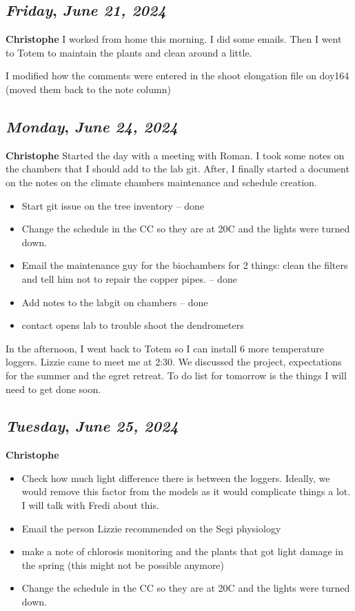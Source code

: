 \begin {itemize}
\def\day{\textit{June 21, 2024}}
\def\weekday{\textit{Friday}}
\subsection*{\weekday, \day}
\textbf {Christophe}
I worked from home this morning. I did some emails. Then I went to Totem to maintain the plants and clean around a little.
\par I modified how the comments were entered in the shoot elongation file on doy164 (moved them back to the note column)

\def\day{\textit{June 24, 2024}}
\def\weekday{\textit{Monday}}
\subsection*{\weekday, \day}
\textbf {Christophe}
Started the day with a meeting with Roman. I took some notes on the chambers that I should add to the lab git. After, I finally started a document on the notes on the climate chambers maintenance and schedule creation.
\begin {itemize}
	\item Start git issue on the tree inventory -- done
	\item Change the schedule in the CC so they are at 20C and the lights were turned down. 
	\item Email the maintenance guy for the biochambers for 2 things: clean the filters and tell him not to repair the copper pipes.  -- done
	\item Add notes to the labgit on chambers -- done
	\item contact opens lab to trouble shoot the dendrometers
\end {itemize}

\par In the afternoon, I went back to Totem so I can install 6 more temperature loggers. Lizzie came to meet me at 2:30. We discussed the project, expectations for the summer and the egret retreat. To do list for tomorrow is the things I will need to get done soon. 

\def\day{\textit{June 25, 2024}}
\def\weekday{\textit{Tuesday}}
\subsection*{\weekday, \day}
\textbf {Christophe}

\begin {itemize}
	\item Check how much light difference there is between the loggers. Ideally, we would remove this factor from the models as it would complicate things a lot. I will talk with Fredi about this. 
	\item Email the person Lizzie recommended on the Segi physiology
	\item make a note of chlorosis monitoring and the plants that got light damage in the spring (this might not be possible anymore)
	\item Change the schedule in the CC so they are at 20C and the lights were turned down. 
\end {itemize}


\end{itemize}

